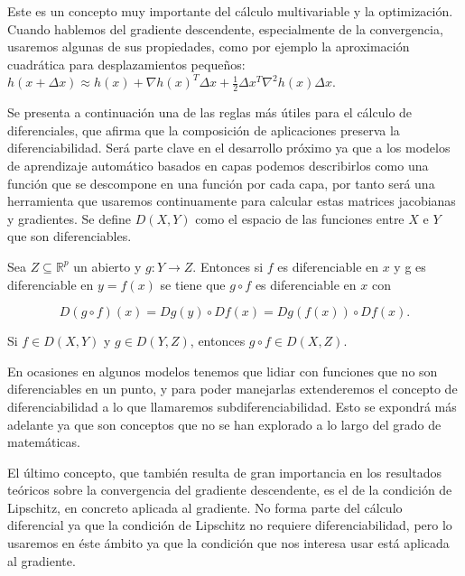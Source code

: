 Este es un concepto muy importante del cálculo multivariable y la optimización. Cuando hablemos del gradiente descendente, especialmente de la convergencia, usaremos algunas de sus propiedades, como por ejemplo la aproximación cuadrática para desplazamientos pequeños: $h(x + \Delta x) \approx h(x) + \nabla h(x)^T \Delta x + \frac{1}{2} \Delta x^T \nabla^2 h(x) \Delta x$. %
		


Se presenta a continuación una de las reglas más útiles para el cálculo de diferenciales, que afirma que la composición de aplicaciones preserva la diferenciabilidad. Será parte clave en el desarrollo próximo ya que a los modelos de aprendizaje automático basados en capas podemos describirlos como una función que se descompone en una función por cada capa, por tanto será una herramienta que usaremos continuamente para calcular estas matrices jacobianas y gradientes. Se define $D(X,Y)$ como el espacio de las funciones entre $X$ e $Y$ que son diferenciables.

\begin{teorema}
    Sea $Z \subseteq \mathbb{R}^p$ un abierto y $g:Y \rightarrow Z$. Entonces si $f$ es diferenciable en $x$ y g es diferenciable en $y=f(x)$ se tiene que $g \circ f$ es diferenciable en $x$ con

    $$D(g \circ f)(x) = Dg(y) \circ Df(x) = Dg(f(x)) \circ Df(x).$$

    \raggedright{Si $f \in D(X, Y)$ y  $g \in D(Y,Z)$, entonces $g \circ f \in D(X, Z)$.}
    
\end{teorema}


En ocasiones en algunos modelos tenemos que lidiar con funciones que no son diferenciables en un punto, y para poder manejarlas extenderemos el concepto de diferenciabilidad a lo que llamaremos subdiferenciabilidad. Esto se expondrá más adelante ya que son conceptos que no se han explorado a lo largo del grado de matemáticas.


El último concepto, que también resulta de gran importancia en los resultados teóricos sobre la convergencia del gradiente descendente, es el de la condición de Lipschitz, en concreto aplicada al gradiente. No forma parte del cálculo diferencial ya que la condición de Lipschitz no requiere diferenciabilidad, pero lo usaremos en éste ámbito ya que la condición que nos interesa usar está aplicada al gradiente.

